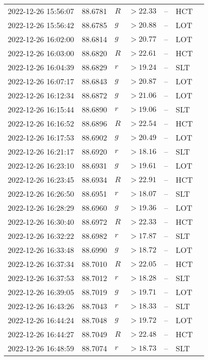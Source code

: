 \documentclass{nature_plusfigure}
\begin{document}
\begin{supplement}
\begin{center}
\begin{longtable}{lllllll}
2022-12-26 15:56:07 & 88.6781 & $R$ & $>22.33$ & -- & HCT &  \\ 
2022-12-26 15:56:42 & 88.6785 & $g$ & $>20.88$ & -- & LOT &  \\ 
2022-12-26 16:02:00 & 88.6814 & $g$ & $>20.77$ & -- & LOT &  \\ 
2022-12-26 16:03:00 & 88.6820 & $R$ & $>22.61$ & -- & HCT &  \\ 
2022-12-26 16:04:39 & 88.6829 & $r$ & $>19.24$ & -- & SLT &  \\ 
2022-12-26 16:07:17 & 88.6843 & $g$ & $>20.87$ & -- & LOT &  \\ 
2022-12-26 16:12:34 & 88.6872 & $g$ & $>21.06$ & -- & LOT &  \\ 
2022-12-26 16:15:44 & 88.6890 & $r$ & $>19.06$ & -- & SLT &  \\ 
2022-12-26 16:16:52 & 88.6896 & $R$ & $>22.54$ & -- & HCT &  \\ 
2022-12-26 16:17:53 & 88.6902 & $g$ & $>20.49$ & -- & LOT &  \\ 
2022-12-26 16:21:17 & 88.6920 & $r$ & $>18.16$ & -- & SLT &  \\ 
2022-12-26 16:23:10 & 88.6931 & $g$ & $>19.61$ & -- & LOT &  \\ 
2022-12-26 16:23:45 & 88.6934 & $R$ & $>22.91$ & -- & HCT &  \\ 
2022-12-26 16:26:50 & 88.6951 & $r$ & $>18.07$ & -- & SLT &  \\ 
2022-12-26 16:28:29 & 88.6960 & $g$ & $>19.36$ & -- & LOT &  \\ 
2022-12-26 16:30:40 & 88.6972 & $R$ & $>22.33$ & -- & HCT &  \\ 
2022-12-26 16:32:22 & 88.6982 & $r$ & $>17.87$ & -- & SLT &  \\ 
2022-12-26 16:33:48 & 88.6990 & $g$ & $>18.72$ & -- & LOT &  \\ 
2022-12-26 16:37:34 & 88.7010 & $R$ & $>22.05$ & -- & HCT &  \\ 
2022-12-26 16:37:53 & 88.7012 & $r$ & $>18.28$ & -- & SLT &  \\ 
2022-12-26 16:39:05 & 88.7019 & $g$ & $>19.71$ & -- & LOT &  \\ 
2022-12-26 16:43:26 & 88.7043 & $r$ & $>18.33$ & -- & SLT &  \\ 
2022-12-26 16:44:24 & 88.7048 & $g$ & $>19.72$ & -- & LOT &  \\ 
2022-12-26 16:44:27 & 88.7049 & $R$ & $>22.48$ & -- & HCT &  \\ 
2022-12-26 16:48:59 & 88.7074 & $r$ & $>18.73$ & -- & SLT &  \\ 

\end{longtable}
\end{center}
\end{supplement}
\end{document}

